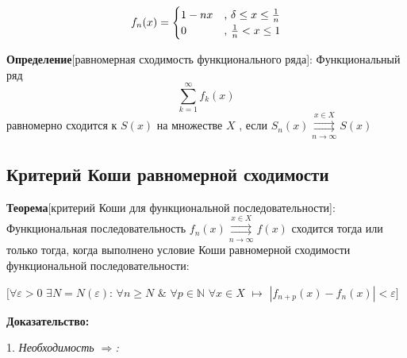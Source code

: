 \documentclass[a4paper,12pt]{article} %
\begin{document}
\\[5 mm]
\begin{equation*}
f_n(x) = 
 \begin{cases}
   1-nx &\text{, $\delta \leq x \leq {1 \over n}$}\\
   0 &\text{, ${1\over n}< x\leq 1$}
 \end{cases}
\end{equation*}





\noindent \textbf{Определение}[равномерная сходимость функционального ряда]:\newline 
Функциональный ряд $$\sum_{k = 1}^{\infty}  f_k(x)$$ равномерно сходится к $S(x)$ на множестве $X$ , если $S_n(x) \overset{x \in X}{\underset{n \rightarrow \infty}{\rightrightarrows}} S(x)$

\subsection{Критерий Коши равномерной сходимости}

\noindent \textbf{Теорема}[критерий Коши для функциональной последовательности]: \newline
Функциональная последовательность $f_n(x) \overset{x \in X}{\underset{n \rightarrow \infty}{\rightrightarrows}} f(x)$ сходится тогда или только тогда, когда выполнено условие Коши
равномерной сходимости функциональной последовательности: \newline

\hspace*{5mm}$\big[\forall \varepsilon > 0 $  $\exists N = N(\varepsilon)$: $\forall n \geq N$  $\&$ $\forall p \in  \mathds{N}$ $\forall x \in X$ $\longmapsto$ \newline 
\hspace*{50mm}$|f_{n+p}(x) -f_n(x)| < \varepsilon\big]$

\noindent \textbf{Доказательство:} \newline

 1. \textit{Необходимость $\Rightarrow$:} \newline
\end{document}
